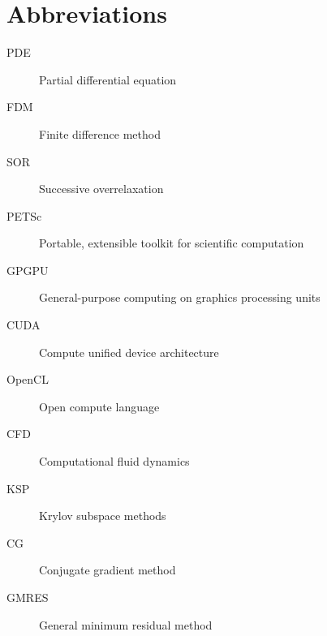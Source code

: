\chapter{Abbreviations}

\begin{description}
	\item[PDE] Partial differential equation
	\item[FDM] Finite difference method
	\item[SOR] Successive overrelaxation
	\item[PETSc] Portable, extensible toolkit for scientific computation
	\item[GPGPU] General-purpose computing on graphics processing units
	\item[CUDA] Compute unified device architecture
	\item[OpenCL] Open compute language
	\item[CFD] Computational fluid dynamics
	\item[KSP] Krylov subspace methods
	\item[CG] Conjugate gradient method
	\item[GMRES] General minimum residual method
\end{description}
